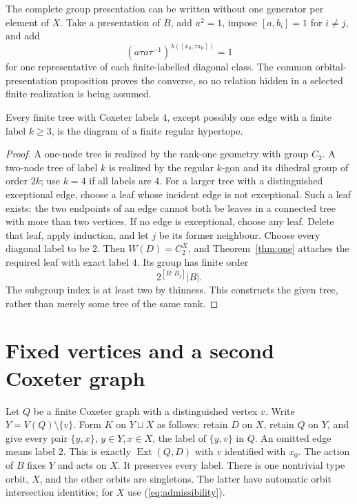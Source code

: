 The complete group presentation can be written without one generator per element of $X$. Take a presentation of $B$, add $a^2=1$, impose $[a,b_i]=1$ for $i\ne j$, and add
\begin{equation}\label{eq:pairrels}
(a\tau a\tau^{-1})^{\lambda([x_0,\tau x_0])}=1
\end{equation}
for one representative of each finite-labelled diagonal class. The common orbital-presentation proposition proves the converse, so no relation hidden in a selected finite realization is being assumed.

\begin{corollary}\label{cor:trees}
Every finite tree with Coxeter labels $4$, except possibly one edge with a finite label $k\geq3$, is the diagram of a finite regular hypertope.
\end{corollary}
\begin{proof}
A one-node tree is realized by the rank-one geometry with group $C_2$. A two-node tree of label $k$ is realized by the regular $k$-gon and its dihedral group of order $2k$; use $k=4$ if all labels are $4$. For a larger tree with a distinguished exceptional edge, choose a leaf whose incident edge is not exceptional. Such a leaf exists: the two endpoints of an edge cannot both be leaves in a connected tree with more than two vertices. If no edge is exceptional, choose any leaf. Delete that leaf, apply induction, and let $j$ be its former neighbour. Choose every diagonal label to be $2$. Then $W(D)=C_2^X$, and Theorem~\ref{thm:one} attaches the required leaf with exact label $4$. Its group has finite order
\[
2^{[B:B_j]}|B|.
\]
The subgroup index is at least two by thinness. This constructs the given tree, rather than merely some tree of the same rank.
\end{proof}

\section{Fixed vertices and a second Coxeter graph}
Let $Q$ be a finite Coxeter graph with a distinguished vertex $v$. Write $Y=V(Q)\setminus\{v\}$. Form $K$ on $Y\sqcup X$ as follows: retain $D$ on $X$, retain $Q$ on $Y$, and give every pair $\{y,x\}$, $y\in Y,x\in X$, the label of $\{y,v\}$ in $Q$. An omitted edge means label $2$. This is exactly $\operatorname{Ext}(Q,D)$ with $v$ identified with $x_0$. The action of $B$ fixes $Y$ and acts on $X$. It preserves every label. There is one nontrivial type orbit, $X$, and the other orbits are singletons. The latter have automatic orbit intersection identities; for $X$ use (\ref{eq:admissibility}).

